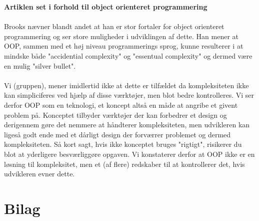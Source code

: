 \documentclass[12pt]{article}
\begin{document}
\noindent\textbf{Artiklen set i forhold til object orienteret programmering}\\\\
Brooks nævner blandt andet at han er stor fortaler for object orienteret programmering og ser store muligheder i udviklingen af dette. Han mener at OOP, sammen med et høj niveau programmerings sprog, kunne resulterer i at mindske både "accidential complexity" og "essentual complexity" og dermed være en mulig "silver bullet".\\\\
Vi (gruppen), mener imidlertid ikke at dette er tilfældet da kompleksiteten ikke kan simpliciferes ved hjælp af disse værktøjer, men blot bedre kontrolleres. Vi ser derfor OOP som en teknologi, et koncept altså en måde at angribe et givent problem på. Konceptet tilbyder værktøjer der kan forbedrer et design og derigennem gøre det nemmere at håndterer kompleksiteten, men udvikleren kan ligeså godt ende med et dårligt design der forværrer problemet og dermed kompleksiteten. Så kort sagt, hvis ikke konceptet bruges "rigtigt", risikerer du blot at yderligere besværliggøre opgaven. Vi konstaterer derfor at OOP ikke er en løsning til kompleksitet, men et (af flere) redskaber til at kontrollerer det, hvis udvikleren evner dette.
\pagebreak
\section{Bilag}
\end{document}
